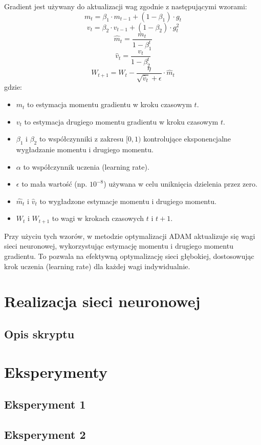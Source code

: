 \documentclass{article}
\begin{document}
Gradient jest używany do aktualizacji wag zgodnie z następującymi wzorami:
\[m_t = \beta_1 \cdot m_{t-1} + (1 - \beta_1) \cdot g_t\]
\[v_t = \beta_2 \cdot v_{t-1} + (1 - \beta_2) \cdot g_t^2\]
\[\hat{m}_t = \frac{m_t}{1 - \beta_1^t}\]
\[\hat{v}_t = \frac{v_t}{1 - \beta_2^t}\]
\[ W_{t+1} = W_t - \frac{\eta}{\sqrt{\hat{v}_t} + \epsilon} \cdot \hat{m}_t \]
gdzie:
\begin{itemize}
    \item \(m_t\) to estymacja momentu gradientu w kroku czasowym \(t\).
    \item \(v_t\) to estymacja drugiego momentu gradientu w kroku czasowym \(t\).
    \item \(\beta_1\) i \(\beta_2\) to współczynniki z zakresu \([0, 1)\) kontrolujące eksponencjalne wygładzanie momentu i drugiego momentu.
    \item \(\alpha\) to współczynnik uczenia (learning rate).
    \item \(\epsilon\) to mała wartość (np. \(10^{-8}\)) używana w celu uniknięcia dzielenia przez zero.
    \item \(\hat{m}_t\) i \(\hat{v}_t\) to wygładzone estymacje momentu i drugiego momentu.
    \item \(W_{t}\) i \(W_{t+1}\) to wagi w krokach czasowych \(t\) i \(t+1\).
\end{itemize}
Przy użyciu tych wzorów, w metodzie optymalizacji ADAM aktualizuje się wagi sieci neuronowej, wykorzystując estymację momentu i drugiego momentu gradientu.
To pozwala na efektywną optymalizację sieci głębokiej, dostosowując krok uczenia (learning rate) dla każdej wagi indywidualnie.
\section{Realizacja sieci neuronowej}
\subsection{Opis skryptu}
\section{Eksperymenty}
\subsection{Eksperyment 1}
\subsection{Eksperyment 2}
\end{document}
